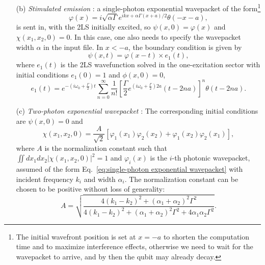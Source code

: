 \documentclass[final,1p,times]{elsarticle}
\begin{document}
\begin{enumerate}
	\item[(b)] \textit{Stimulated emission} \cite{FangNJP18}: a single-photon exponential wavepacket of the form\footnote{The initial wavefront position is set at $x=-a$ to shorten the computation time and to maximize interference effects, otherwise we need to wait for the wavepacket to arrive, and by then the qubit may already decay.}
	\begin{equation}
	\varphi(x)=i\sqrt{\alpha \Gamma} e^{ikx+\alpha\Gamma(x+a)/2}\theta(-x-a),
	\label{eq:single-photon exponential wavepacket}
	\end{equation}
	is sent in, with the 2LS initially excited, so $\psi(x,0)=\varphi(x)$ and $\chi(x_1, x_2, 0)=0$. In this case, one also needs to specify the wavepacket width $\alpha$ in the input file. %
	In $x<-a$, the boundary condition is given by 
	\begin{equation}
	\psi(x,t) = \varphi(x-t)\times e_1(t),
	\end{equation}
	where $e_1(t)$ is the 2LS wavefunction solved in the one-excitation sector with initial conditions $e_1(0)=1$ and $\phi(x, 0) =0$,
	\begin{equation}
	e_1(t)=e^{-(i\omega_0+\frac{\Gamma}{2})t}\sum_{n=0}^{\infty}\frac{1}{n!}\left[\frac{\Gamma}{2}e^{(i\omega_0+\frac{\Gamma}{2})2a}(t-2na)\right]^n\theta(t-2na).
	\label{eq:spontaneous emission solution}
	\end{equation}
	
	\item[(c)] \emph{Two-photon exponential wavepacket} \cite{FrancescoBIC}: 
	The corresponding initial conditions are $\psi(x,0)=0$ and
	\begin{equation}
	\chi(x_1, x_2, 0) = \frac{A}{\sqrt{2}}\left[\varphi_1(x_1)\varphi_2(x_2)+\varphi_1(x_2)\varphi_2(x_1)\right],
	\end{equation} 
	where $A$ is the normalization constant such that $\iint dx_1 dx_2 |\chi(x_1, x_2, 0)|^2=1$ and $\varphi_i(x)$ is the $i$-th photonic wavepacket, assumed of the form Eq.~\eqref{eq:single-photon exponential wavepacket} with incident frequency $k_i$ and width $\alpha_i$.
	The normalization constant can be chosen to be positive without loss of generality:
	\begin{equation}
	A = \sqrt{\frac{4(k_1- k_2)^2+(\alpha_1+\alpha_2)^2\Gamma ^2}{4(k_1- k_2)^2 +(\alpha_1+\alpha_2)^2\Gamma ^2+4\alpha_1\alpha_2\Gamma ^2}}.
	\end{equation}
	

\end{enumerate}
\end{document}
